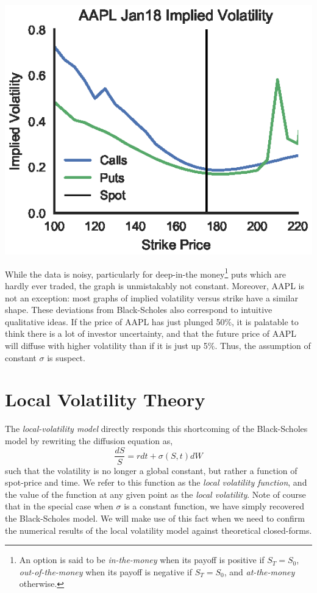 \documentclass[12pt]{article}
\numberwithin{equation}{section}
\begin{document}
\begin{center}
\includegraphics{figs/aapliv}
\end{center}

While the data is noisy, particularly for deep-in-the money\footnote{An option is said to be \emph{in-the-money} when its payoff is positive if $S_T = S_0$, \emph{out-of-the-money} when its payoff is negative if $S_T = S_0$, and \emph{at-the-money} otherwise.} puts
which are hardly ever traded, the graph is unmistakably not constant. Moreover,
AAPL is not an exception: most graphs of implied volatility versus strike have a
similar shape. These deviations from Black-Scholes also correspond to
intuitive qualitative ideas. If the price of AAPL has just plunged 50\%, it is
palatable to think there is a lot of investor uncertainty, and that the future
price of AAPL will diffuse with higher volatility than if it is just up 5\%.
Thus, the assumption of constant $\sigma$ is suspect.

\section{Local Volatility Theory}
\label{sec:localvoltheory}

The \emph{local-volatility model} directly responds this shortcoming of the
Black-Scholes model by rewriting the diffusion equation as,
\begin{equation}
 \frac{dS}{S} = r dt + \sigma(S,t) dW 
\end{equation}
such that the volatility is no longer a global constant, but rather a function
of spot-price and time. We refer to this function as the \emph{local volatility
function}, and the value of the function at any given point as the \emph{local
volatility}. Note of course that in the special case when $\sigma$ is a constant
function, we have simply recovered the Black-Scholes model. We will make use of
this fact when we need to confirm the numerical results of the local volatility
model against theoretical closed-forms.
\end{document}
